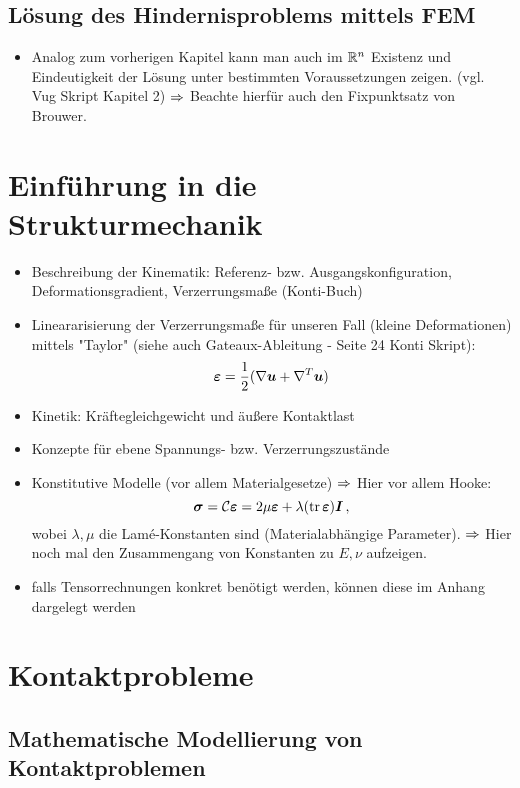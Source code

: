 \subsection{Lösung des Hindernisproblems mittels FEM}

\begin{itemize}
\item Analog zum vorherigen Kapitel kann man auch im $\mathbb{R}^n$ Existenz und Eindeutigkeit der Lösung unter bestimmten Voraussetzungen zeigen. (vgl. Vug Skript Kapitel 2) $\Rightarrow$ Beachte hierfür auch den Fixpunktsatz von Brouwer.
\end{itemize}

\section{Einführung in die Strukturmechanik}

\begin{itemize}
\item Beschreibung der Kinematik: Referenz- bzw. Ausgangskonfiguration, Deformationsgradient, Verzerrungsmaße (Konti-Buch)
\item Lineararisierung der Verzerrungsmaße für unseren Fall (kleine Deformationen) mittels "Taylor" (siehe auch Gateaux-Ableitung - Seite 24 Konti Skript):
\[
	\boldsymbol {\varepsilon} = \frac 1 2 (\nabla \boldsymbol u + \nabla^T \boldsymbol u)
\]
\item Kinetik: Kräftegleichgewicht und äußere Kontaktlast
\item Konzepte für ebene Spannungs- bzw. Verzerrungszustände
\item Konstitutive Modelle (vor allem Materialgesetze) $\Rightarrow$ Hier vor allem Hooke:
\[
	\boldsymbol \sigma = \mathcal C \boldsymbol {\varepsilon} = 2 \mu \boldsymbol {\varepsilon} + \lambda (\operatorname{tr} \boldsymbol {\varepsilon}) \boldsymbol I \, ,
\]
wobei $\lambda,\mu$ die Lamé-Konstanten sind (Materialabhängige Parameter). $\Rightarrow$ Hier noch mal den Zusammengang von Konstanten zu $E,\nu$ aufzeigen.
\item falls Tensorrechnungen konkret benötigt werden, können diese im Anhang dargelegt werden
\end{itemize}

\section{Kontaktprobleme}

\subsection{Mathematische Modellierung von Kontaktproblemen}

